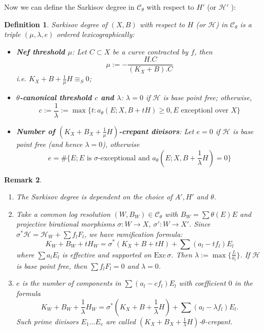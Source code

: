 \documentclass[11pt]{amsart}
\numberwithin{equation}{section}
\newtheorem{defn}{Definition}[subsection]
\newtheorem{rmk}[defn]{Remark}
\begin{document}
Now we can define the Sarkisov degree in $\mathcal{C}_{\theta}$ with respect to $H'$ (or $\mathcal{H}'$ ):
\begin{defn}\label{sarkisovdegree}
  \cite[Definition 3.8]{brunoLogSarkisovProgram1995}
  Sarkisov degree of $ (X,B) $ with respect to $ H $ (or $ \mathcal{H} $) in $ \mathcal{C}_\theta $ is a triple $ (\mu,\lambda,e) $ ordered lexicographically:
  \begin{itemize}
    \item \textbf{Nef threshold $ \mu $}: Let $ C\subset X  $ be a curve contracted by $ f $, then 
      \[ \mu:=-\frac{H.C}{(K_X+B).C} \]
      i.e. $ K_X+B+\frac{1}{\mu} H \equiv_S0$;
    \item \textbf{$ \theta $-canonical threshold $c$ and $ \lambda $}: $\lambda=0$ if $ \mathcal{H} $ is base point free; otherwise,
      \[ c:=\frac{1}{\lambda}:=\max\{t:a_{\theta}(E;X,B+tH)\geqslant 0 ,E\text{ exceptionl over }X \}\] 
    \item \textbf{Number of $(K_{X}+B_{X}+\frac{1}{\mu}H)$-crepant divisors}: Let $ e=0 $ if $ \mathcal{H} $ is base point free (and hence $ \lambda=0 $), otherwise 
      \[ e=\#\{E; E \text{ is }\sigma\text{-exceptional and } a_{\theta}(E;X,B+\frac{1}{\lambda} H)=0 \} \]
  \end{itemize}
\end{defn}
\begin{rmk} 
 \begin{enumerate}
    \item  The Sarkisov degree is dependent on the choice of  $A', H'$ and  $\theta$.
   \item Take a common log resolution  $ (W,B_W)\in \mathcal{C}_\theta $ with $ B_W=\sum \theta(E)E $ and projective birational morphisms $ \sigma:W\to X $, $ \sigma':W\to X' $. Since $\sigma^*\mathcal{H}=\mathcal{H}_W+\sum f_{l}F_{l}$, we have ramification formula:
      \[ K_W+B_W+tH_W=\sigma^*(K_X+B+tH)+\sum(a_l-tf_l)E_l \]
      where $ \sum a_lE_l $ is effective and supported on $ \mathrm{Exc}\,\sigma $. Then $\lambda:=\max\{ \frac{f_l}{a_l}\}$. If $ \mathcal{H} $ is base point free, then $ \sum f_lF_l=0 $ and $\lambda=0  $.
      \item   $ e $ is the number of components in $\sum(a_l-cf_l)E_l$ with coefficient $ 0 $ in the formula
      \[ K_W+B_W+\frac{1}{\lambda} H_W=\sigma^*(K_X+B+\frac{1}{\lambda} H)+\sum(a_l-\lambda f_l)E_l .\]
      Such prime divisors $E_{1}\ldots E_{e}$ are called $(K_{X}+B_{X}+\frac{1}{\lambda}H)$-$\theta$-crepant.
 \end{enumerate} 
\end{rmk}
\end{document}
